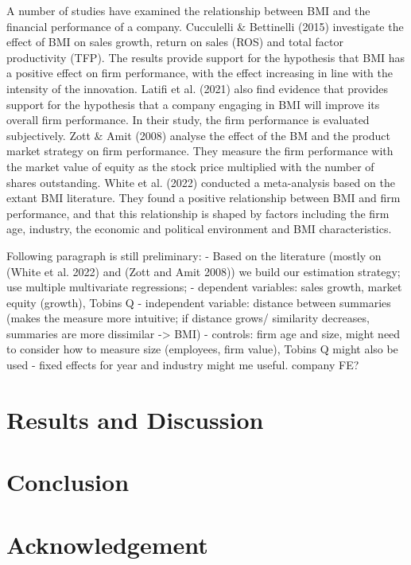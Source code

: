 \documentclass[
]{article}
\begin{document}
A number of studies have examined the relationship between BMI and the
financial performance of a company. Cucculelli \& Bettinelli (2015)
investigate the effect of BMI on sales growth, return on sales (ROS) and
total factor productivity (TFP). The results provide support for the
hypothesis that BMI has a positive effect on firm performance, with the
effect increasing in line with the intensity of the innovation. Latifi
et al. (2021) also find evidence that provides support for the
hypothesis that a company engaging in BMI will improve its overall firm
performance. In their study, the firm performance is evaluated
subjectively. Zott \& Amit (2008) analyse the effect of the BM and the
product market strategy on firm performance. They measure the firm
performance with the market value of equity as the stock price
multiplied with the number of shares outstanding. White et al. (2022)
conducted a meta-analysis based on the extant BMI literature. They found
a positive relationship between BMI and firm performance, and that this
relationship is shaped by factors including the firm age, industry, the
economic and political environment and BMI characteristics.

Following paragraph is still preliminary: - Based on the literature
(mostly on (White et al. 2022) and (Zott and Amit 2008)) we build our
estimation strategy; use multiple multivariate regressions; - dependent
variables: sales growth, market equity (growth), Tobins Q - independent
variable: distance between summaries (makes the measure more intuitive;
if distance grows/ similarity decreases, summaries are more dissimilar
-\textgreater{} BMI) - controls: firm age and size, might need to
consider how to measure size (employees, firm value), Tobins Q might
also be used - fixed effects for year and industry might me useful.
company FE?

\section{Results and Discussion}\label{results-and-discussion}

\section{Conclusion}\label{conclusion}

\section{Acknowledgement}\label{acknowledgement}
\end{document}
